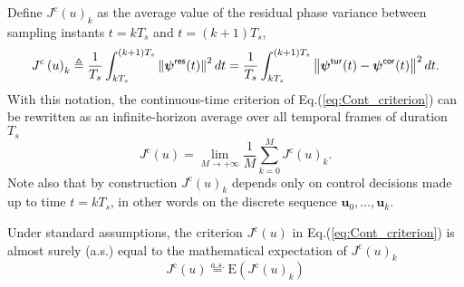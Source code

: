 \documentclass[a4paper,12pt]{article}
\newcommand{\0}{\mathsf{0}} %
\newcommand{\tur}{\mathsf{\tiny{tur}}}
\newcommand{\res}{\mathsf{\tiny{res}}}
\newcommand{\cor}{\mathsf{\tiny{cor}}}
\newcommand{\phivec}{{\boldsymbol{\psi}}}
\newcommand{\uvec}{{\mathbf{u}}}
\begin{document}


        
        Define $J^\mathrm{c}(u)_k$ as the average value of the residual phase
        variance between sampling instants $t=kT_s$ and $t=(k+1)T_s$, 
	\begin{equation}\label{eq:Cont_criterion_stepbystep}
          J^\mathrm{c}\left(u\right)_k  \triangleq  \frac{1}{{T_s}} \int_{k{T_s}}^{(k+1){T_s}} \left\|\phivec^{\res}(t)\right\|^2 dt = \frac{1}{{T_s}} \int_{k{T_s}}^{(k+1){T_s}} \left\|\phivec^{\tur}(t) - \phivec^{\cor}(t)\right\|^2 dt.
	\end{equation}
        With this notation, the continuous-time criterion of
        Eq.(\ref{eq:Cont_criterion}) can be rewritten as an
        infinite-horizon average over
        all temporal frames of duration ${T_s}$ 
	\begin{equation}\label{eq:Jc_average_Jck}
          J^\mathrm{c}(u) = \lim_{M\rightarrow+\infty}\frac{1}{M}\sum_{k=0}^M J^\mathrm{c}(u)_k.
	\end{equation} 
        Note also that by construction $J^\mathrm{c}(u)_k$ depends only on
        control decisions made up to time $t=kT_s$, in other words on
        the discrete sequence $\uvec_0,\ldots, \uvec_k$.
        
        Under standard assumptions, the criterion $J^\mathrm{c}(u)$ in Eq.(\ref{eq:Cont_criterion}) is 
        almost surely (a.s.) equal to the mathematical expectation of
        $J^\mathrm{c}(u)_k$ 
        \begin{equation}
          J^\mathrm{c}(u) \overset{a.s.}{=} \text{E}\left( J^\mathrm{c}(u)_k \right)
        \end{equation}

\end{document}
